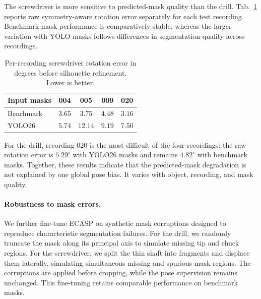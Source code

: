 
\label{supp:predicted_mask_analysis}

The screwdriver is more sensitive to predicted-mask quality than the drill.
Tab.~\ref{tab:supp_screwdriver_recordings} reports raw symmetry-aware
rotation error separately for each test recording.
Benchmark-mask performance is comparatively stable, whereas the larger
variation with YOLO masks follows differences in segmentation quality across
recordings.

\begin{table}[H]
\centering
\caption{Per-recording screwdriver rotation error in degrees before
silhouette refinement. Lower is better.}
\label{tab:supp_screwdriver_recordings}
\small
\setlength{\tabcolsep}{7pt}
\begin{tabular}{@{}lcccc@{}}
\toprule
Input masks & 004 & 005 & 009 & 020 \\
\midrule
Benchmark & \(3.65\) & \(3.75\) & \(4.48\) & \(3.16\) \\
YOLO26 & \(5.74\) & \(12.14\) & \(9.19\) & \(7.50\) \\
\bottomrule
\end{tabular}
\end{table}

For the drill, recording 020 is the most difficult of the four recordings:
the raw rotation error is \(5.29^\circ\) with YOLO26 masks and remains
\(4.82^\circ\) with benchmark masks.
Together, these results indicate that the predicted-mask degradation is not explained by one global pose bias. It varies with object, recording, and mask
quality.

\paragraph{Robustness to mask errors.}
We further fine-tune ECASP on synthetic mask corruptions designed to reproduce characteristic segmentation failures.
For the drill, we randomly truncate the mask along its principal axis to simulate missing tip and chuck regions.
For the screwdriver, we split the thin shaft into fragments and displace them laterally, simulating simultaneous missing and spurious mask regions.
The corruptions are applied before cropping, while the pose supervision remains unchanged.
This fine-tuning retains comparable performance on benchmark masks.


